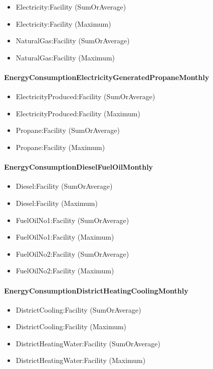 \begin{itemize}
\item
  Electricity:Facility (SumOrAverage)
\item
  Electricity:Facility (Maximum)
\item
  NaturalGas:Facility (SumOrAverage)
\item
  NaturalGas:Facility (Maximum)
\end{itemize}

\paragraph{EnergyConsumptionElectricityGeneratedPropaneMonthly}\label{energyconsumptionelectricitygeneratedpropanemonthly}

\begin{itemize}
\item
  ElectricityProduced:Facility (SumOrAverage)
\item
  ElectricityProduced:Facility (Maximum)
\item
  Propane:Facility (SumOrAverage)
\item
  Propane:Facility (Maximum)
\end{itemize}

\paragraph{EnergyConsumptionDieselFuelOilMonthly}\label{energyconsumptiondieselfuel-oilmonthly}

\begin{itemize}
\item
  Diesel:Facility (SumOrAverage)
\item
  Diesel:Facility (Maximum)
\item
  FuelOilNo1:Facility (SumOrAverage)
\item
  FuelOilNo1:Facility (Maximum)
\item
  FuelOilNo2:Facility (SumOrAverage)
\item
  FuelOilNo2:Facility (Maximum)
\end{itemize}

\paragraph{EnergyConsumptionDistrictHeatingCoolingMonthly}\label{energyconsumptiondistrictheatingcoolingmonthly}

\begin{itemize}
\item
  DistrictCooling:Facility (SumOrAverage)
\item
  DistrictCooling:Facility (Maximum)
\item
  DistrictHeatingWater:Facility (SumOrAverage)
\item
  DistrictHeatingWater:Facility (Maximum)
\end{itemize}

